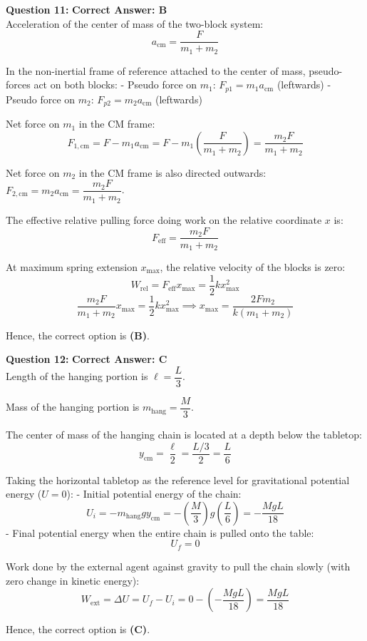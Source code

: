 \documentclass[11pt,a4paper]{article}
\begin{document}
\begin{tcolorbox}[solbox]
\textbf{\textcolor{primaryDark}{Question 11:}} \hfill \textbf{\textcolor{l1Green}{Correct Answer: B}}\\
\vspace{4pt}
Acceleration of the center of mass of the two-block system:
$$a_{\text{cm}} = \frac{F}{m_1 + m_2}$$

In the non-inertial frame of reference attached to the center of mass, pseudo-forces act on both blocks:
- Pseudo force on $m_1$: $F_{p1} = m_1 a_{\text{cm}}$ (leftwards)
- Pseudo force on $m_2$: $F_{p2} = m_2 a_{\text{cm}}$ (leftwards)

Net force on $m_1$ in the CM frame:
$$F_{1,\text{cm}} = F - m_1 a_{\text{cm}} = F - m_1\left(\frac{F}{m_1 + m_2}\right) = \frac{m_2 F}{m_1 + m_2}$$

Net force on $m_2$ in the CM frame is also directed outwards: $F_{2,\text{cm}} = m_2 a_{\text{cm}} = \dfrac{m_2 F}{m_1 + m_2}$.

The effective relative pulling force doing work on the relative coordinate $x$ is:
$$F_{\text{eff}} = \frac{m_2 F}{m_1 + m_2}$$

At maximum spring extension $x_{\max}$, the relative velocity of the blocks is zero:
$$W_{\text{rel}} = F_{\text{eff}} x_{\max} = \frac{1}{2}k x_{\max}^2$$
$$\frac{m_2 F}{m_1 + m_2} x_{\max} = \frac{1}{2}k x_{\max}^2 \implies x_{\max} = \frac{2F m_2}{k(m_1 + m_2)}$$

Hence, the correct option is \textbf{(B)}.
\end{tcolorbox}

\begin{tcolorbox}[solbox]
\textbf{\textcolor{primaryDark}{Question 12:}} \hfill \textbf{\textcolor{l1Green}{Correct Answer: C}}\\
\vspace{4pt}
Length of the hanging portion is $\ell = \dfrac{L}{3}$.

Mass of the hanging portion is $m_{\text{hang}} = \dfrac{M}{3}$.

The center of mass of the hanging chain is located at a depth below the tabletop:
$$y_{\text{cm}} = \frac{\ell}{2} = \frac{L/3}{2} = \frac{L}{6}$$

Taking the horizontal tabletop as the reference level for gravitational potential energy ($U = 0$):
- Initial potential energy of the chain:
$$U_i = -m_{\text{hang}} g y_{\text{cm}} = -\left(\frac{M}{3}\right)g\left(\frac{L}{6}\right) = -\frac{MgL}{18}$$
- Final potential energy when the entire chain is pulled onto the table:
$$U_f = 0$$

Work done by the external agent against gravity to pull the chain slowly (with zero change in kinetic energy):
$$W_{\text{ext}} = \Delta U = U_f - U_i = 0 - \left(-\frac{MgL}{18}\right) = \frac{MgL}{18}$$

Hence, the correct option is \textbf{(C)}.
\end{tcolorbox}
\end{document}
